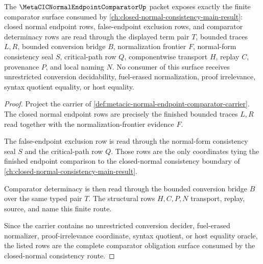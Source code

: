 \begin{theorem}
\label{thm:metacic-normal-endpoint-comparator-vision-obligations}
The $\MetaCICNormalEndpointComparatorUp$ packet exposes exactly the finite comparator surface consumed by \autoref{ch:closed-normal-consistency-main-result}: closed normal endpoint rows, false-endpoint exclusion rows, and comparator determinacy rows are read through the displayed term pair $T$, bounded traces $L,R$, bounded conversion bridge $B$, normalization frontier $F$, normal-form consistency seal $S$, critical-path row $Q$, componentwise transport $H$, replay $C$, provenance $P$, and local naming $N$. No consumer of this surface receives unrestricted conversion decidability, fuel-erased normalization, proof irrelevance, syntax quotient equality, or host equality.
\end{theorem}
\begin{proof}
Project the carrier of \autoref{def:metacic-normal-endpoint-comparator-carrier}. The closed normal endpoint rows are precisely the finished bounded traces $L,R$ read together with the normalization-frontier evidence $F$.

The false-endpoint exclusion row is read through the normal-form consistency seal $S$ and the critical-path row $Q$. Those rows are the only coordinates tying the finished endpoint comparison to the closed-normal consistency boundary of \autoref{ch:closed-normal-consistency-main-result}.

Comparator determinacy is then read through the bounded conversion bridge $B$ over the same typed pair $T$. The structural rows $H,C,P,N$ transport, replay, source, and name this finite route.

Since the carrier contains no unrestricted conversion decider, fuel-erased normalizer, proof-irrelevance coordinate, syntax quotient, or host equality oracle, the listed rows are the complete comparator obligation surface consumed by the closed-normal consistency route.
\end{proof}



